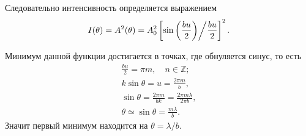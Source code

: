 Следовательно интенсивность определяется выражением
\begin{equation}
	I(\theta) = A^2(\theta) = A_0^2 \left[ \sin \left( \frac{bu}{2}\right) \middle/  \frac{bu}{2} \right]^2.
\end{equation}

Минимум данной функции достигается в точках, где обнуляется синус, то есть
\begin{gather*}
	\frac{bu}{2} = \pi m, \quad n \in \mathbb Z;\\
	k \sin \theta = u = \frac{2 \pi m}{b},\\
	\sin \theta = \frac{2 \pi m}{bk} = \frac{2 \pi m \lambda}{2 \pi b},\\
	\theta \simeq \sin \theta = \frac{m \lambda}{b}.
\end{gather*}
Значит первый минимум находится на $\theta = \lambda/b$.


